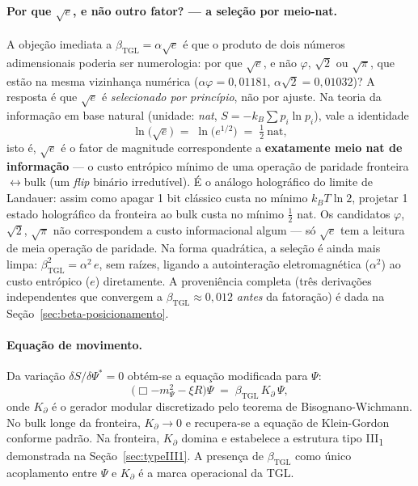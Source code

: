 \documentclass[12pt,a4paper]{article}
\newcommand{\betatgl}{\beta_{\text{TGL}}}
\newcommand{\Kpartial}{K_{\partial}}
\newcommand{\TGL}{\textsc{TGL}}
\begin{document}
\paragraph{Por que $\sqrt{e}$, e não outro fator? --- a seleção por meio-nat.}
A objeção imediata a $\betatgl = \alpha\sqrt{e}$ é que o produto de dois números
adimensionais poderia ser numerologia: por que $\sqrt{e}$, e não $\varphi$,
$\sqrt{2}$ ou $\sqrt{\pi}$, que estão na mesma vizinhança numérica
($\alpha\varphi = 0{,}01181$, $\alpha\sqrt{2} = 0{,}01032$)?  A resposta é que
$\sqrt{e}$ é \emph{selecionado por princípio}, não por ajuste.  Na teoria da
informação em base natural (unidade: \textit{nat}, $S = -k_B\sum p_i\ln p_i$),
vale a identidade
\begin{equation}
\ln\bigl(\sqrt{e}\bigr) \;=\; \ln\bigl(e^{1/2}\bigr) \;=\; \tfrac{1}{2}\ \text{nat},
\label{eq:meio-nat}
\end{equation}
isto é, $\sqrt{e}$ é o fator de magnitude correspondente a \textbf{exatamente
meio nat de informação} --- o custo entrópico mínimo de uma operação de paridade
fronteira$\leftrightarrow$bulk (um \emph{flip} binário irredutível).
É o análogo holográfico do limite de Landauer: assim como apagar 1 bit clássico
custa no mínimo $k_B T\ln 2$, projetar 1 estado holográfico da fronteira ao bulk
custa no mínimo $\tfrac{1}{2}$ nat.  Os candidatos $\varphi$, $\sqrt{2}$,
$\sqrt{\pi}$ não correspondem a custo informacional algum --- só $\sqrt{e}$ tem
a leitura de meia operação de paridade.  Na forma quadrática, a seleção é ainda
mais limpa: $\betatgl^{2} = \alpha^{2}\,e$, sem raízes, ligando a autointeração
eletromagnética ($\alpha^2$) ao custo entrópico ($e$) diretamente.  A
proveniência completa (três derivações independentes que convergem a
$\betatgl \approx 0{,}012$ \emph{antes} da fatoração) é dada na
Seção~\ref{sec:beta-posicionamento}.

\paragraph{Equação de movimento.}
Da variação $\delta S / \delta \Psi^{*} = 0$ obtém-se a equação modificada
para $\Psi$:
\begin{equation}
\bigl(\Box - m_{\Psi}^{2} - \xi R\bigr) \Psi
\;=\; \betatgl \, \Kpartial \, \Psi,
\label{eq:eom-Psi}
\end{equation}
onde $\Kpartial$ é o gerador modular discretizado pelo teorema de
Bisognano-Wichmann.  No bulk longe da fronteira, $\Kpartial \to 0$ e
recupera-se a equação de Klein-Gordon conforme padrão.  Na fronteira,
$\Kpartial$ domina e estabelece a estrutura tipo III\textsubscript{1}
demonstrada na Seção~\ref{sec:typeIII1}.  A presença de $\betatgl$ como
único acoplamento entre $\Psi$ e $\Kpartial$ é a marca operacional da \TGL{}.
\end{document}
